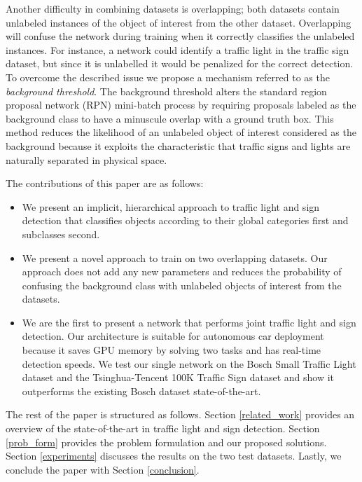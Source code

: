 \documentclass[10pt, conference, compsocconf]{IEEEtran}
\begin{document}
Another difficulty in combining datasets is overlapping; both datasets contain unlabeled instances of the object of interest from the other dataset. Overlapping will confuse the network during training when it correctly classifies the unlabeled instances. For instance, a network could identify a traffic light in the traffic sign dataset, but since it is unlabelled it would be penalized for the correct detection. To overcome the described issue we propose a mechanism referred to as the \textit{background threshold}. The background threshold alters the standard region proposal network (RPN) \cite{ren2015} mini-batch process by requiring proposals labeled as the background class to have a minuscule overlap with a ground truth box. This method reduces the likelihood of an unlabeled object of interest considered as the background because it exploits the characteristic that traffic signs and lights are naturally separated in physical space.

The contributions of this paper are as follows:
\begin{itemize}
    \item We present an implicit, hierarchical approach to traffic light and sign detection that classifies objects according to their global categories first and subclasses second.
    \item We present a novel approach to train on two overlapping datasets. Our approach does not add any new parameters and reduces the probability of confusing the background class with unlabeled objects of interest from the datasets.
    \item We are the first to present a network that performs joint traffic light and sign detection. Our architecture is suitable for autonomous car deployment because it saves GPU memory by solving two tasks and has real-time detection speeds. We test our single network on the Bosch Small Traffic Light dataset \cite{behrendt2017} and the Tsinghua-Tencent 100K Traffic Sign dataset \cite{tencent} and show it outperforms the existing Bosch dataset state-of-the-art.
\end{itemize}

The rest of the paper is structured as follows. Section \ref{related_work} provides an overview of the state-of-the-art in traffic light and sign detection. Section \ref{prob_form} provides the problem formulation and our proposed solutions. Section \ref{experiments} discusses the results on the two test datasets. Lastly, we conclude the paper with Section \ref{conclusion}.
\end{document}
